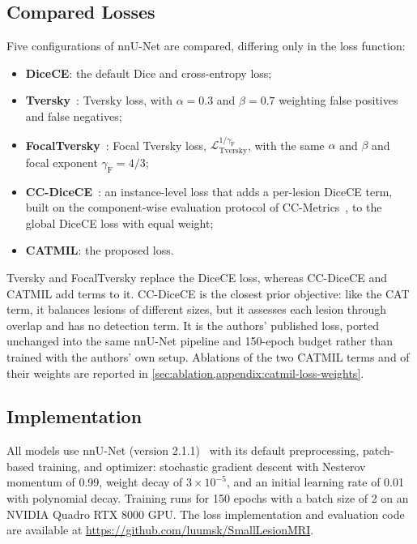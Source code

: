 \subsection{Compared Losses}

Five configurations of nnU-Net are compared, differing only in the loss
function:
\begin{itemize}
    \item \textbf{DiceCE}: the default Dice and cross-entropy loss;
    \item \textbf{Tversky}~\cite{salehi_tversky_2017}: Tversky loss, with
    $\alpha=0.3$ and $\beta=0.7$ weighting false positives and false
    negatives;
    \item \textbf{FocalTversky}~\cite{abraham_novel_2019}: Focal Tversky
    loss, $\mathcal{L}_{\mathrm{Tversky}}^{1/\gamma_{\mathrm{F}}}$, with the
    same $\alpha$ and $\beta$ and focal exponent $\gamma_{\mathrm{F}}=4/3$;
    \item \textbf{CC-DiceCE}~\cite{bouteille_learning_2026}: an
    instance-level loss that adds a per-lesion DiceCE term, built on the
    component-wise evaluation protocol of CC-Metrics~\cite{jaus_every_2025},
    to the global DiceCE loss with equal weight;
    \item \textbf{CATMIL}: the proposed loss.
\end{itemize}
Tversky and FocalTversky replace the DiceCE loss, whereas CC-DiceCE and
CATMIL add terms to it. CC-DiceCE is the closest prior objective: like the
CAT term, it balances lesions of different sizes, but it assesses each
lesion through overlap and has no detection term. It is the authors'
published loss, ported unchanged into the same nnU-Net pipeline and
150-epoch budget rather than trained with the authors' own setup. Ablations of the two CATMIL terms and of their weights are
reported in \cref{sec:ablation,appendix:catmil-loss-weights}.

\subsection{Implementation}

All models use nnU-Net (version 2.1.1)~\cite{isensee_nnu-net_2021} with
its default preprocessing, patch-based training, and optimizer: stochastic
gradient descent with Nesterov momentum of 0.99, weight decay of
$3\times10^{-5}$, and an initial learning rate of 0.01 with polynomial
decay. Training runs for 150 epochs with a batch size of 2 on an NVIDIA
Quadro RTX 8000 GPU. The loss implementation and evaluation code are
available at \url{https://github.com/luumsk/SmallLesionMRI}.

